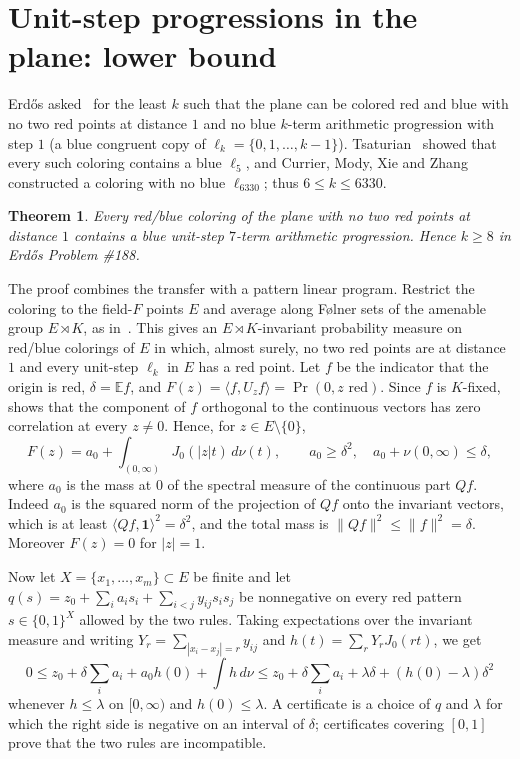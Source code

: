 \documentclass[11pt]{amsart}
\newtheorem{theorem}{Theorem}[section]
\theoremstyle{definition}
\newcommand{\E}{\mathbb{E}}
\begin{document}
\section{Unit-step progressions in the plane: lower bound}\label{sec:188}

Erd\H{o}s asked~\cite[Problem \#188]{EP188} for the least $k$ such that the plane can be colored red and blue with no two red points at distance $1$ and no blue $k$-term arithmetic progression with step $1$ (a blue congruent copy of $\ell_k=\{0,1,\dots,k-1\}$). Tsaturian~\cite{Tsaturian} showed that every such coloring contains a blue $\ell_5$, and Currier, Mody, Xie and Zhang~\cite{CMXZ} constructed a coloring with no blue $\ell_{6330}$; thus $6\le k\le6330$.

\begin{theorem}\label{thm:188}
Every red/blue coloring of the plane with no two red points at distance $1$ contains a blue unit-step $7$-term arithmetic progression. Hence $k\ge8$ in Erd\H{o}s Problem \#188.
\end{theorem}

The proof combines the transfer with a pattern linear program. Restrict the coloring to the field-$F$ points $E$ and average along F\o lner sets of the amenable group $E\rtimes K$, as in~\cite[\S2.2]{OAI}. This gives an $E\rtimes K$-invariant probability measure on red/blue colorings of $E$ in which, almost surely, no two red points are at distance $1$ and every unit-step $\ell_k$ in $E$ has a red point. Let $f$ be the indicator that the origin is red, $\delta=\E f$, and $F(z)=\langle f,U_zf\rangle=\Pr(0,z\text{ red})$. Since $f$ is $K$-fixed, \cite[Theorem 2.3]{OAI} shows that the component of $f$ orthogonal to the continuous vectors has zero correlation at every $z\ne0$. Hence, for $z\in E\setminus\{0\}$,
\[
F(z)=a_0+\int_{(0,\infty)}J_0(|z|t)\,d\nu(t),\qquad a_0\ge\delta^2,\quad a_0+\nu(0,\infty)\le\delta,
\]
where $a_0$ is the mass at $0$ of the spectral measure of the continuous part $Qf$. Indeed $a_0$ is the squared norm of the projection of $Qf$ onto the invariant vectors, which is at least $\langle Qf,\mathbf 1\rangle^2=\delta^2$, and the total mass is $\|Qf\|^2\le\|f\|^2=\delta$. Moreover $F(z)=0$ for $|z|=1$.

Now let $X=\{x_1,\dots,x_m\}\subset E$ be finite and let $q(s)=z_0+\sum_ia_is_i+\sum_{i<j}y_{ij}s_is_j$ be nonnegative on every red pattern $s\in\{0,1\}^X$ allowed by the two rules. Taking expectations over the invariant measure and writing $Y_r=\sum_{|x_i-x_j|=r}y_{ij}$ and $h(t)=\sum_rY_rJ_0(rt)$, we get
\[
0\le z_0+\delta\sum_ia_i+a_0h(0)+\int h\,d\nu\le z_0+\delta\sum_ia_i+\lambda\delta+(h(0)-\lambda)\delta^2
\]
whenever $h\le\lambda$ on $[0,\infty)$ and $h(0)\le\lambda$. A certificate is a choice of $q$ and $\lambda$ for which the right side is negative on an interval of $\delta$; certificates covering $[0,1]$ prove that the two rules are incompatible.
\end{document}
